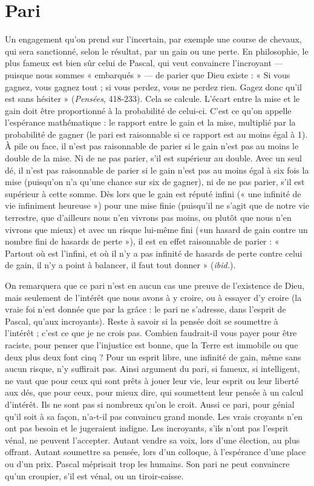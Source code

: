 \section{Pari}
Un engagement qu’on prend sur l’incertain, par exemple une course
de chevaux, qui sera sanctionné, selon le résultat, par un gain ou
une perte. En philosophie, le plus fameux est bien sûr celui de Pascal, qui
veut convaincre l’incroyant — puisque nous sommes « embarqués » — de
parier que Dieu existe : « Si vous gagnez, vous gagnez tout ; si vous perdez,
vous ne perdez rien. Gagez donc qu’il est sans hésiter » ({\it Pensées}, 418-233).
Cela se calcule. L'écart entre la mise et le gain doit être proportionné à la
probabilité de celui-ci. C’est ce qu’on appelle l’espérance mathématique : le
rapport entre le gain et la mise, multiplié par la probabilité de gagner (le pari
est raisonnable si ce rapport est au moins égal à 1). À pile ou face, il n’est
pas raisonnable de parier si le gain n’est pas au moins le double de la mise.
Ni de ne pas parier, s’il est supérieur au double. Avec un seul dé, il n’est pas
raisonnable de parier si le gain n’est pas au moins égal à six fois la mise
(puisqu'on n’a qu’une chance sur six de gagner), ni de ne pas parier, s’il est
supérieur à cette somme. Dès lors que le gain est réputé infini (« une infinité
de vie infiniment heureuse ») pour une mise finie (puisqu'il ne s’agit que de
notre vie terrestre, que d’ailleurs nous n’en vivrons pas moins, ou plutôt que
nous n’en vivrons que mieux) et avec un risque lui-même fini («un hasard
de gain contre un nombre fini de hasards de perte »), il est en effet raisonnable
de parier : « Partout où est l’infini, et où il n’y a pas infinité de hasards
de perte contre celui de gain, il n’y a point à balancer, il faut tout donner »
({\it ibid.}).

On remarquera que ce pari n’est en aucun cas une preuve de l'existence de
Dieu, mais seulement de l’intérêt que nous avons à y croire, ou à essayer d’y
croire (la vraie foi n’est donnée que par la grâce : le pari ne s’adresse, dans
l'esprit de Pascal, qu'aux incroyants). Reste à savoir si la pensée doit se soumettre
à l'intérêt ; c’est ce que je ne crois pas. Combien faudrait-il vous payer
pour être raciste, pour penser que l'injustice est bonne, que la Terre est immobile
ou que deux plus deux font cinq ? Pour un esprit libre, une infinité de
gain, même sans aucun risque, n’y suffirait pas. Ainsi argument du pari, si
fameux, si intelligent, ne vaut que pour ceux qui sont prêts à jouer leur vie, leur
esprit ou leur liberté aux dés, que pour ceux, pour mieux dire, qui soumettent
leur pensée à un calcul d'intérêt. Ils ne sont pas si nombreux qu’on le croit.
Aussi ce pari, pour génial qu'il soit à sa façon, n’a-t-il pas convaincu grand
monde. Les vrais croyants n’en ont pas besoin et le jugeraient indigne. Les
incroyants, s'ils n’ont pas l’esprit vénal, ne peuvent l’accepter. Autant vendre sa
voix, lors d’une élection, au plus offrant. Autant soumettre sa pensée, lors d’un
colloque, à l’espérance d’une place ou d’un prix. Pascal méprisait trop les
humains. Son pari ne peut convaincre qu’un croupier, s’il est vénal, ou un
tiroir-caisse.

